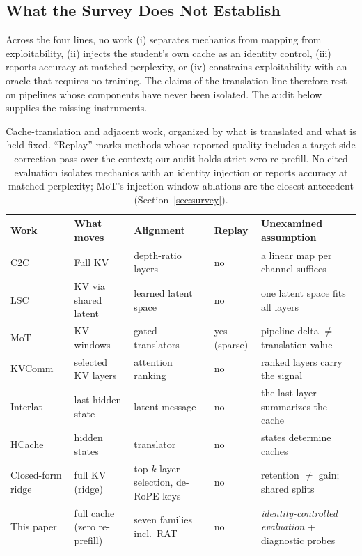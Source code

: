\documentclass[10pt]{article}
\begin{document}
\subsection{What the Survey Does Not Establish}
Across the four lines, no work (i) separates mechanics from mapping from
exploitability, (ii) injects the student's own cache as an identity control,
(iii) reports accuracy at matched perplexity, or (iv) constrains exploitability
with an oracle that requires no training. The claims of the translation line
therefore rest on pipelines whose components have never been isolated. The
audit below supplies the missing instruments.

\begin{table}[t]
\centering
\small
\caption{Cache-translation and adjacent work, organized by what is
translated and what is held fixed. ``Replay'' marks methods whose reported
quality includes a target-side correction pass over the context; our audit
holds strict zero re-prefill. No cited evaluation isolates mechanics with an
identity injection or reports accuracy at matched perplexity; MoT's
injection-window ablations are the closest antecedent
(Section~\ref{sec:survey}).}
\label{tab:related}
\begin{tabular}{p{2.6cm}p{2.2cm}p{2.4cm}p{1.6cm}p{3.4cm}}
\toprule
Work & What moves & Alignment & Replay & Unexamined assumption \\
\midrule
C2C~\citep{c2c2025} & Full KV & depth-ratio layers & no & a linear map per
channel suffices \\
LSC~\citep{lsc2026} & KV via shared latent & learned latent space & no &
one latent space fits all layers \\
MoT~\citep{mot2026} & KV windows & gated translators & yes (sparse) &
pipeline delta $\neq$ translation value \\
KVComm~\citep{kvcomm2025} & selected KV layers & attention ranking & no &
ranked layers carry the signal \\
Interlat~\citep{interlat2025} & last hidden state & latent message & no &
the last layer summarizes the cache \\
HCache~\citep{hcache2025} & hidden states & translator & no & states
determine caches \\
\midrule
Closed-form ridge~\citep{heo2026} & full KV (ridge) & top-$k$ layer selection, de-RoPE
keys & no & retention $\neq$ gain; shared splits \\
\midrule
This paper & full cache (zero re-prefill) & seven families incl.\ RAT & no &
\emph{identity-controlled evaluation} + diagnostic probes \\
\bottomrule
\end{tabular}
\end{table}
\end{document}
